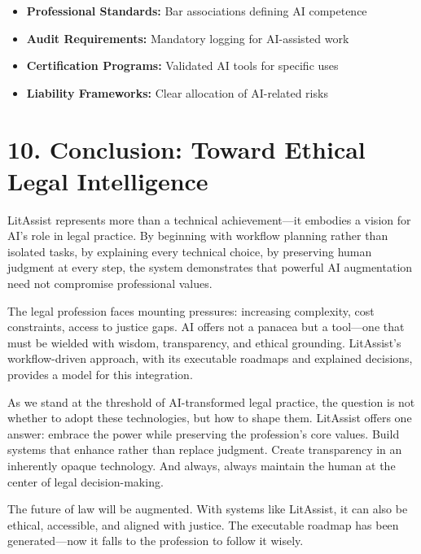 \documentclass[12pt,a4paper]{article}
\begin{document}
\begin{itemize}
\item \textbf{Professional Standards:} Bar associations defining AI competence
\item \textbf{Audit Requirements:} Mandatory logging for AI-assisted work
\item \textbf{Certification Programs:} Validated AI tools for specific uses
\item \textbf{Liability Frameworks:} Clear allocation of AI-related risks
\end{itemize}

\section*{10. Conclusion: Toward Ethical Legal Intelligence}

LitAssist represents more than a technical achievement—it embodies a vision for AI's role in legal practice. By beginning with workflow planning rather than isolated tasks, by explaining every technical choice, by preserving human judgment at every step, the system demonstrates that powerful AI augmentation need not compromise professional values.

The legal profession faces mounting pressures: increasing complexity, cost constraints, access to justice gaps. AI offers not a panacea but a tool—one that must be wielded with wisdom, transparency, and ethical grounding. LitAssist's workflow-driven approach, with its executable roadmaps and explained decisions, provides a model for this integration.

As we stand at the threshold of AI-transformed legal practice, the question is not whether to adopt these technologies, but how to shape them. LitAssist offers one answer: embrace the power while preserving the profession's core values. Build systems that enhance rather than replace judgment. Create transparency in an inherently opaque technology. And always, always maintain the human at the center of legal decision-making.

The future of law will be augmented. With systems like LitAssist, it can also be ethical, accessible, and aligned with justice. The executable roadmap has been generated—now it falls to the profession to follow it wisely.
\end{document}
